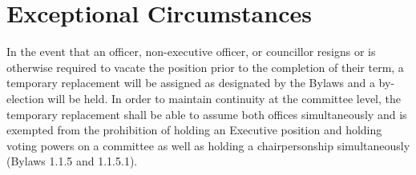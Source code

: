 \section{Exceptional Circumstances}
In the event that an officer, non-executive officer, or councillor resigns or is otherwise required to vacate the position prior to the completion of their term, a temporary replacement will be assigned as designated by the Bylaws and a by-election will be held. In order to maintain continuity at the committee level, the temporary replacement shall be able to assume both offices simultaneously and is exempted from the prohibition of holding an Executive position and holding voting powers on a committee as well as holding a chairpersonship simultaneously (Bylaws 1.1.5 and 1.1.5.1).

